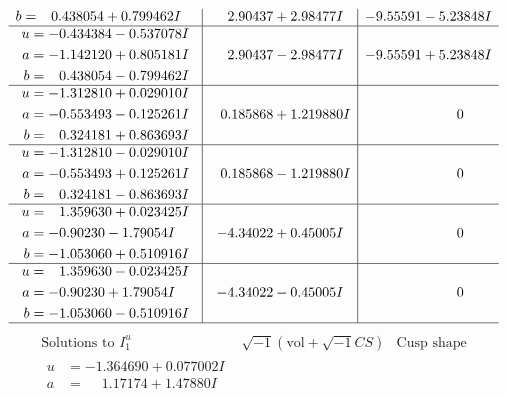\documentclass[1p]{elsarticle_modified}
\theoremstyle{definition}
\newcommand{\I}{\sqrt{-1}}
\begin{document}
$$\begin{array}{c|c|c}
\begin{aligned}
b &= \phantom{-}0.438054 + 0.799462 I\end{aligned}
 & \phantom{-}2.90437 + 2.98477 I & -9.55591 - 5.23848 I \\ \hline\begin{aligned}
u &= -0.434384 - 0.537078 I \\
a &= -1.142120 + 0.805181 I \\
b &= \phantom{-}0.438054 - 0.799462 I\end{aligned}
 & \phantom{-}2.90437 - 2.98477 I & -9.55591 + 5.23848 I \\ \hline\begin{aligned}
u &= -1.312810 + 0.029010 I \\
a &= -0.553493 - 0.125261 I \\
b &= \phantom{-}0.324181 + 0.863693 I\end{aligned}
 & \phantom{-}0.185868 + 1.219880 I & \phantom{-0.000000 } 0 \\ \hline\begin{aligned}
u &= -1.312810 - 0.029010 I \\
a &= -0.553493 + 0.125261 I \\
b &= \phantom{-}0.324181 - 0.863693 I\end{aligned}
 & \phantom{-}0.185868 - 1.219880 I & \phantom{-0.000000 } 0 \\ \hline\begin{aligned}
u &= \phantom{-}1.359630 + 0.023425 I \\
a &= -0.90230 - 1.79054 I \\
b &= -1.053060 + 0.510916 I\end{aligned}
 & -4.34022 + 0.45005 I & \phantom{-0.000000 } 0 \\ \hline\begin{aligned}
u &= \phantom{-}1.359630 - 0.023425 I \\
a &= -0.90230 + 1.79054 I \\
b &= -1.053060 - 0.510916 I\end{aligned}
 & -4.34022 - 0.45005 I & \phantom{-0.000000 } 0\\
 \hline 
 \end{array}$$\newpage$$\begin{array}{c|c|c}  
\text{Solutions to }I^u_{1}& \I (\text{vol} + \sqrt{-1}CS) & \text{Cusp shape}\\
 \hline 
\begin{aligned}
u &= -1.364690 + 0.077002 I \\
a &= \phantom{-}1.17174 + 1.47880 I \\

\end{aligned}
\end{array}$$
\end{document}

